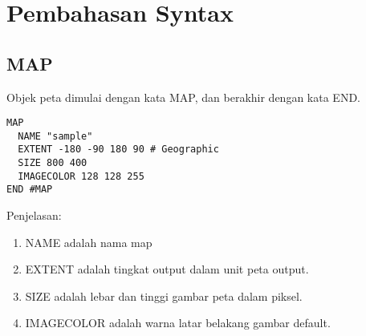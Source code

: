 \section{Pembahasan Syntax}
\subsection{MAP}
Objek peta dimulai dengan kata MAP, dan berakhir dengan kata END.
\begin{lstlisting}
MAP
  NAME "sample"
  EXTENT -180 -90 180 90 # Geographic
  SIZE 800 400
  IMAGECOLOR 128 128 255
END #MAP
\end{lstlisting}

Penjelasan:
\begin{enumerate}
\item NAME adalah nama map
\item EXTENT adalah tingkat output dalam unit peta output.
\item SIZE adalah lebar dan tinggi gambar peta dalam piksel.
\item IMAGECOLOR adalah warna latar belakang gambar default.
\end{enumerate}
